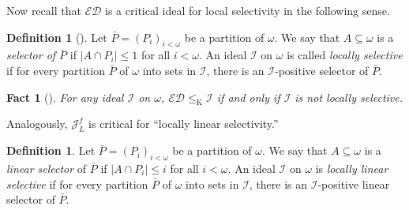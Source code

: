 \documentclass[a4paper,12pt]{amsart}
\newtheorem{fac}[thm]{Fact}
\theoremstyle{definition}
\newtheorem{dfn}[thm]{Definition}
\numberwithin{thm}{section}
\numberwithin{equation}{section}
\newcommand{\ed}{\mathcal{ED}}
\newcommand{\I}{\mathscr{I}}
\newcommand{\J}{\mathscr{J}}
\begin{document}
   Now recall that $\ed$ is a critical ideal for local selectivity in the following sense.

    \begin{dfn}[{\cite{BTW82}}]
    	Let $\bar{P}=(P_i)_{i<\omega}$ be a partition of $\omega$. We say that $A\subseteq\omega$ is a \emph{selector of $\bar{P}$} if $|A\cap P_i|\leq 1$ for all $i<\omega$. An ideal $\I$ on $\omega$ is called \emph{locally selective} if for every partition $\bar{P}$ of $\omega$ into sets in $\I$, there is an $\I$-positive selector of $\bar{P}$.
    \end{dfn}
    
    \begin{fac}[{\cite[Proposition 3.2]{Hru11}}]
    	\label{fac:ED_chara}
        For any ideal $\I$ on $\omega$, $\mathcal{ED}\leq_{\mathrm{K}}\I$ if and only if $\I$ is not locally selective.
    \end{fac}

    Analogously, $\J_L^f$ is critical for ``locally linear selectivity.''
    
    \begin{dfn}
    	Let $\bar{P}=(P_i)_{i<\omega}$ be a partition of $\omega$. We say that $A\subseteq\omega$ is a \emph{linear selector} of $\bar{P}$ if $|A\cap P_i|\leq i$ for all $i<\omega$. An ideal $\I$ on $\omega$ is \emph{locally linear selective} if for every partition $\bar{P}$ of $\omega$ into sets in $\I$, there is an $\I$-positive linear selector of $\bar{P}$.
    \end{dfn}
\end{document}
